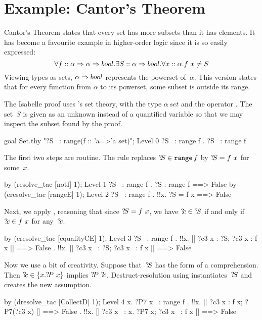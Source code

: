 \goodbreak
\section{Example: Cantor's Theorem}\label{sec:hol-cantor}
Cantor's Theorem states that every set has more subsets than it has
elements.  It has become a favourite example in higher-order logic since
it is so easily expressed:
\[  \forall f::\alpha \Rightarrow \alpha \Rightarrow bool. \exists S::\alpha\Rightarrow bool.
    \forall x::\alpha. f~x \not= S 
\] 
%
Viewing types as sets, $\alpha\Rightarrow bool$ represents the powerset
of~$\alpha$.  This version states that for every function from $\alpha$ to
its powerset, some subset is outside its range.  

The Isabelle proof uses \HOL's set theory, with the type $\alpha\,set$ and
the operator .  The set~$S$ is given as an unknown instead of a
quantified variable so that we may inspect the subset found by the proof.
\begin{ttbox}
goal Set.thy "?S ~: range\thinspace(f :: 'a=>'a set)";
{\out Level 0}
{\out ?S ~: range f}
{. ?S ~: range f}
\end{ttbox}
The first two steps are routine.  The rule  replaces
${?\!S}\in \texttt{range} \, f$ by ${?\!S}=f~x$ for some~$x$.
\begin{ttbox}
by (resolve_tac [notI] 1);
{\out Level 1}
{\out ?S ~: range f}
{. ?S : range f ==> False}
\ttbreak
by (eresolve_tac [rangeE] 1);
{\out Level 2}
{\out ?S ~: range f}
{. !!x. ?S = f x ==> False}
\end{ttbox}
Next, we apply , reasoning that since ${?\!S}=f~x$,
we have ${?\!c}\in {?\!S}$ if and only if ${?\!c}\in f~x$ for
any~${?\!c}$.
\begin{ttbox}
by (eresolve_tac [equalityCE] 1);
{\out Level 3}
{\out ?S ~: range f}
{. !!x. [| ?c3 x : ?S; ?c3 x : f x |] ==> False}
{. !!x. [| ?c3 x ~: ?S; ?c3 x ~: f x |] ==> False}
\end{ttbox}
Now we use a bit of creativity.  Suppose that~${?\!S}$ has the form of a
comprehension.  Then ${?\!c}\in\{x.{?\!P}~x\}$ implies
${?\!P}~{?\!c}$.   Destruct-resolution using 
instantiates~${?\!S}$ and creates the new assumption.
\begin{ttbox}
by (dresolve_tac [CollectD] 1);
{\out Level 4}
{\out {\ttlbrace}x. ?P7 x{\ttrbrace} ~: range f}
{. !!x. [| ?c3 x : f x; ?P7(?c3 x) |] ==> False}
{. !!x. [| ?c3 x ~: {\ttlbrace}x. ?P7 x{\ttrbrace}; ?c3 x ~: f x |] ==> False}
\end{ttbox}
